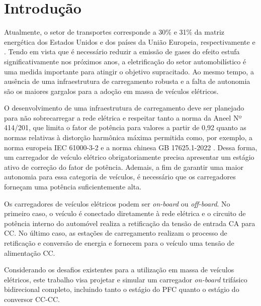 \chapter{Introdução}
Atualmente, o setor de transportes corresponde a 30\% e 31\% da matriz energética dos Estados Unidos e dos países da União Europeia, respectivamente \cite{eia_transportation_energy} e \cite{eurostat_transport_energy}. Tendo em vista que é necessário reduzir a emissão de gases do efeito estufa significativamente nos próximos anos, a eletrificação do setor automobilístico é uma medida importante para atingir o objetivo supracitado. Ao mesmo tempo, a ausência de uma infraestrutura de carregamento robusta e a falta de autonomia são os maiores gargalos para a adoção em massa de veículos elétricos.


O desenvolvimento de uma infraestrutura de carregamento deve ser planejado para não sobrecarregar a rede elétrica e respeitar tanto a norma da Aneel Nº 414/201, que limita o fator de potência para valores a partir de 0,92 quanto as normas relativas à distorção harmônica máxima permitida como, por exemplo, a norma europeia IEC 61000-3-2 e a norma chinesa GB 17625.1-2022 . Dessa forma, um carregador de veículo elétrico obrigatoriamente precisa apresentar um estágio ativo de correção do fator de potência. Ademais, a fim de garantir uma maior autonomia para essa categoria de veículos, é necessário que os carregadores forneçam uma potência suficientemente alta.

Os carregadores de veículos elétricos podem ser \emph{on-board} ou \emph{off-board}. No primeiro caso, o veículo é conectado diretamente à rede elétrica e o circuito de potência interno do automóvel realiza a retificação da tensão de entrada CA para CC. No último caso, as estações de carregamento realizam o processo de retificação e conversão de energia e fornecem para o veículo uma tensão de alimentação CC.

Considerando os desafios existentes para a utilização em massa de veículos elétricos, este trabalho visa projetar e simular um carregador \emph{on-board} trifásico bidirecional completo, incluindo tanto o estágio do PFC quanto o estágio do conversor CC-CC.
